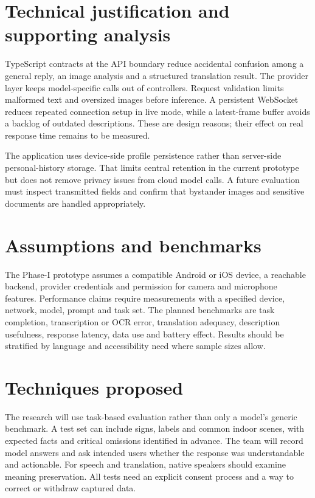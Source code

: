 \documentclass[12pt,a4paper,oneside]{report}
\begin{document}
\section{Technical justification and supporting analysis}
TypeScript contracts at the API boundary reduce accidental confusion among a general reply, an image analysis and a structured translation result. The provider layer keeps model-specific calls out of controllers. Request validation limits malformed text and oversized images before inference. A persistent WebSocket reduces repeated connection setup in live mode, while a latest-frame buffer avoids a backlog of outdated descriptions. These are design reasons; their effect on real response time remains to be measured.

The application uses device-side profile persistence rather than server-side personal-history storage. That limits central retention in the current prototype but does not remove privacy issues from cloud model calls. A future evaluation must inspect transmitted fields and confirm that bystander images and sensitive documents are handled appropriately.

\section{Assumptions and benchmarks}
The Phase-I prototype assumes a compatible Android or iOS device, a reachable backend, provider credentials and permission for camera and microphone features. Performance claims require measurements with a specified device, network, model, prompt and task set. The planned benchmarks are task completion, transcription or OCR error, translation adequacy, description usefulness, response latency, data use and battery effect. Results should be stratified by language and accessibility need where sample sizes allow.

\section{Techniques proposed}
The research will use task-based evaluation rather than only a model's generic benchmark. A test set can include signs, labels and common indoor scenes, with expected facts and critical omissions identified in advance. The team will record model answers and ask intended users whether the response was understandable and actionable. For speech and translation, native speakers should examine meaning preservation. All tests need an explicit consent process and a way to correct or withdraw captured data.
\end{document}

